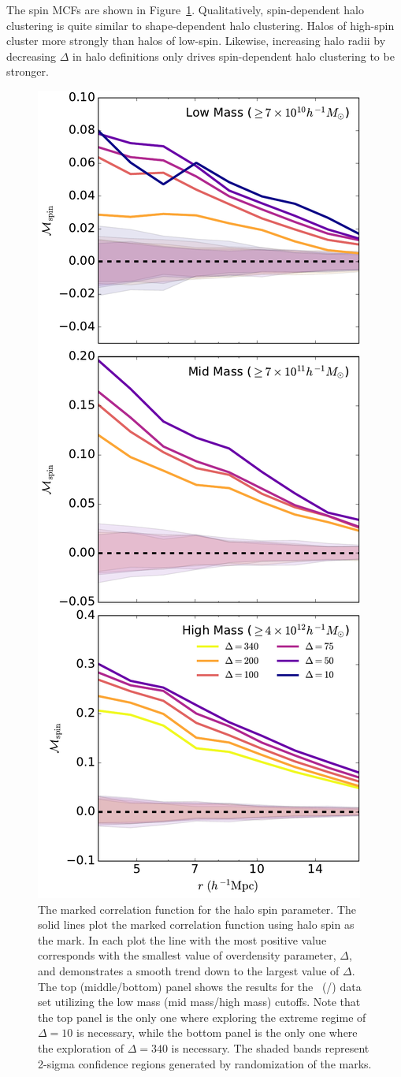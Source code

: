 \documentclass[usenatbib]{mnras}
\begin{document}
The spin MCFs are shown in Figure~\ref{fig:cc_mcf_spin}. Qualitatively, spin-dependent halo clustering is 
quite similar to shape-dependent halo clustering. Halos of high-spin cluster more strongly than halos of 
low-spin.  Likewise, increasing halo radii by decreasing $\Delta$
in halo definitions only drives spin-dependent halo clustering to be stronger.


\begin{figure}
	\centering
	\includegraphics[width=.4\textwidth]{all_mcf_spin.pdf}
	\caption{The marked correlation function for the halo spin parameter. The solid lines plot the marked correlation function using halo spin as the mark. In each plot the line with the most 
positive value corresponds with the smallest value of overdensity parameter, 
$\Delta$, and demonstrates a smooth trend down to the largest value of 
$\Delta$. The top (middle/bottom) panel shows the results for the
\simA \ (\simB /\simC) data set utilizing the low mass (mid mass/high mass) cutoffs. Note
that the top panel is the only one where exploring the extreme regime of $\Delta = 10$ is
necessary, while the bottom panel is the only one where the exploration of $\Delta = 340$
is necessary. The shaded bands represent 2-sigma confidence regions generated by randomization of the marks.
	}
	\label{fig:cc_mcf_spin}
\end{figure}
\end{document}
